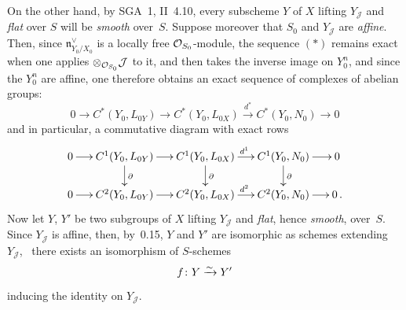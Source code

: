 On the other hand, by SGA~1, II~4.10, every subscheme \(Y\) of \(X\) lifting
\(Y_{\mathcal{J}}\) and \emph{flat} over \(S\) will be \emph{smooth} over~\(S\).%
{\renewcommand{\thefootnote}{(132)}}
Suppose moreover that \(S_{0}\) and \(Y_{\mathcal{J}}\) are \emph{affine}.
Then, since \(\mathfrak{n}^{\vee}_{Y_{0}/X_{0}}\) is a locally free
\(\mathcal{O}_{S_{0}}\)-module, the sequence \((*)\) remains exact when one applies
\(\otimes_{\mathcal{O}_{S_{0}}}\mathcal{J}\) to it, and then takes the inverse image
on \(Y_{0}^{n}\), and since the \(Y_{0}^{n}\) are affine, one therefore
obtains an exact sequence of complexes of abelian groups:
\[
0\longrightarrow
C^{*}(Y_{0},L_{0Y})\longrightarrow
C^{*}(Y_{0},L_{0X})\xrightarrow{d^{*}}
C^{*}(Y_{0},N_{0})\longrightarrow 0
\]
and in particular, a commutative diagram with exact rows
\[
\xymatrix@C=1.45em@R=1.8em{
0\ar[r]
&
C^{1}(Y_{0},L_{0Y})
  \ar[r]
  \ar[d]^{\partial}
&
C^{1}(Y_{0},L_{0X})
  \ar[r]^{d^{1}}
  \ar[d]^{\partial}
&
C^{1}(Y_{0},N_{0})
  \ar[r]
  \ar[d]^{\partial}
&
0
\\
0\ar[r]
&
C^{2}(Y_{0},L_{0Y})
  \ar[r]
&
C^{2}(Y_{0},L_{0X})
  \ar[r]^{d^{2}}
&
C^{2}(Y_{0},N_{0})
  \ar[r]
&
0\,.
}
\]
Now let \(Y\), \(Y'\) be two subgroups of \(X\) lifting \(Y_{\mathcal{J}}\) and
\emph{flat}, hence \emph{smooth}, over~\(S\). Since \(Y_{\mathcal{J}}\) is
affine, then, by~0.15, \(Y\) and \(Y'\) are isomorphic as schemes extending
\(Y_{\mathcal{J}}\), \ie\ there exists an isomorphism of \(S\)-schemes
\[
f\colon Y\xrightarrow{\sim} Y'
\]
inducing the identity on \(Y_{\mathcal{J}}\).
